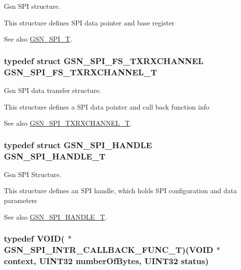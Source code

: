 Gsn SPI structure. 

This structure defines SPI data pointer and base register

\begin{DoxySeeAlso}{See also}
\hyperlink{a00655_ga18a5a1252fa65289699c9caa71d05fca}{GSN\_\-SPI\_\-T}. 
\end{DoxySeeAlso}
\hypertarget{a00655_ga8c9aa14f3eb304db286ecd04e0020447}{
\subsubsection[{GSN\_\-SPI\_\-FS\_\-TXRXCHANNEL\_\-T}]{\setlength{\rightskip}{0pt plus 5cm}typedef struct {\bf GSN\_\-SPI\_\-FS\_\-TXRXCHANNEL}  {\bf GSN\_\-SPI\_\-FS\_\-TXRXCHANNEL\_\-T}}}
\label{a00655_ga8c9aa14f3eb304db286ecd04e0020447}


Gsn SPI data transfer structure. 

This structure defines a SPI data pointer and call back function info

\begin{DoxySeeAlso}{See also}
\hyperlink{a00655_ga0cdbeb0b657e6192938aebc1aaf793de}{GSN\_\-SPI\_\-TXRXCHANNEL\_\-T}. 
\end{DoxySeeAlso}
\hypertarget{a00655_ga046c33438e29676344675866f7935308}{
\subsubsection[{GSN\_\-SPI\_\-HANDLE\_\-T}]{\setlength{\rightskip}{0pt plus 5cm}typedef struct {\bf GSN\_\-SPI\_\-HANDLE} {\bf GSN\_\-SPI\_\-HANDLE\_\-T}}}
\label{a00655_ga046c33438e29676344675866f7935308}


Gsn SPI Structure. 

This structure defines an SPI handle, which holds SPI configuration and data parameters

\begin{DoxySeeAlso}{See also}
\hyperlink{a00655_ga046c33438e29676344675866f7935308}{GSN\_\-SPI\_\-HANDLE\_\-T}. 
\end{DoxySeeAlso}
\hypertarget{a00655_ga4319e7be0e14776c7cd2c7ff7ca8f2c2}{
\subsubsection[{GSN\_\-SPI\_\-INTR\_\-CALLBACK\_\-FUNC\_\-T}]{\setlength{\rightskip}{0pt plus 5cm}typedef VOID( $\ast$ {\bf GSN\_\-SPI\_\-INTR\_\-CALLBACK\_\-FUNC\_\-T})(VOID $\ast$context, {\bf UINT32} numberOfBytes, {\bf UINT32} status)}}
\label{a00655_ga4319e7be0e14776c7cd2c7ff7ca8f2c2}


